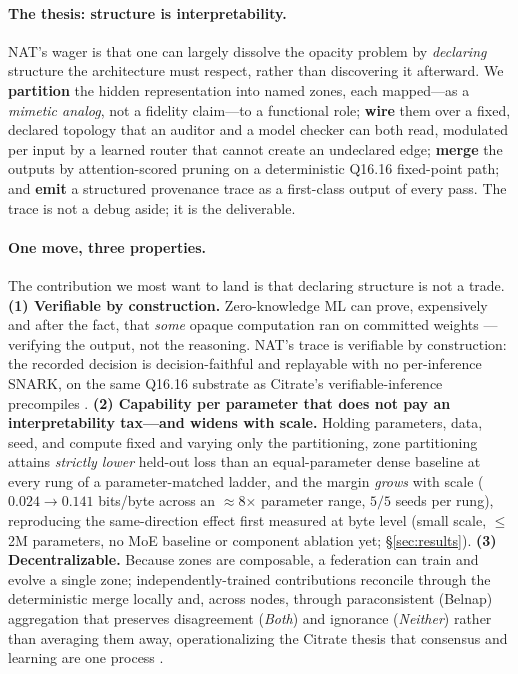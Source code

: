 \documentclass[11pt]{article}
\newcommand{\Qff}{Q16.16}
\begin{document}
\paragraph{The thesis: structure is interpretability.}
NAT's wager is that one can largely dissolve the opacity problem by \emph{declaring} structure the
architecture must respect, rather than discovering it afterward. We \textbf{partition} the hidden
representation into named zones, each mapped---as a \emph{mimetic analog}, not a fidelity claim---to
a functional role; \textbf{wire} them over a fixed, declared topology that an auditor and a model
checker can both read, modulated per input by a learned router that cannot create an undeclared
edge; \textbf{merge} the outputs by attention-scored pruning on a deterministic \Qff{} fixed-point
path; and \textbf{emit} a structured provenance trace as a first-class output of every pass. The
trace is not a debug aside; it is the deliverable.

\paragraph{One move, three properties.}
The contribution we most want to land is that declaring structure is not a trade.
\textbf{(1) Verifiable by construction.} Zero-knowledge ML can prove, expensively and after the
fact, that \emph{some} opaque computation ran on committed weights
\citep{chen2024zkml,sun2024zkllm}---verifying the output, not the reasoning. NAT's trace is
verifiable by construction: the recorded decision is decision-faithful and replayable with no
per-inference SNARK, on the same \Qff{} substrate as Citrate's verifiable-inference precompiles
\citep{citrate10}. \textbf{(2) Capability per parameter that does not pay an interpretability tax---and widens with
scale.} Holding parameters, data, seed, and compute fixed and varying only the partitioning, zone
partitioning attains \emph{strictly lower} held-out loss than an equal-parameter dense baseline at
every rung of a parameter-matched ladder, and the margin \emph{grows} with scale ($0.024 \to 0.141$
bits/byte across an $\approx$8$\times$ parameter range, $5/5$ seeds per rung), reproducing the
same-direction effect first measured at byte level (small scale, $\le$2M parameters, no MoE baseline
or component ablation yet; \S\ref{sec:results}).
\textbf{(3) Decentralizable.} Because zones are composable, a federation can train and evolve a
single zone; independently-trained contributions reconcile through the deterministic merge locally
and, across nodes, through paraconsistent (Belnap) aggregation \citep{belnap1977useful} that
preserves disagreement (\emph{Both}) and ignorance (\emph{Neither}) rather than averaging them away,
operationalizing the Citrate thesis that consensus and learning are one process \citep{citrate2}.
\end{document}
